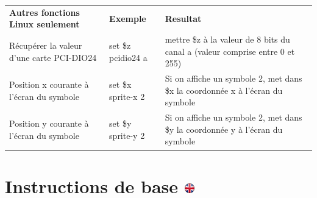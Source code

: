 \documentclass[
]{book}
\begin{document}
\begin{longtable}[]{@{}lll@{}}
\toprule
\endhead
\begin{minipage}[t]{0.29\columnwidth}\raggedright
\textbf{Autres fonctions Linux seulement}\strut
\end{minipage} & \begin{minipage}[t]{0.15\columnwidth}\raggedright
\textbf{Exemple}\strut
\end{minipage} & \begin{minipage}[t]{0.47\columnwidth}\raggedright
\textbf{Resultat}\strut
\end{minipage}\tabularnewline
\begin{minipage}[t]{0.29\columnwidth}\raggedright
Récupérer la valeur d'une carte PCI-DIO24\strut
\end{minipage} & \begin{minipage}[t]{0.15\columnwidth}\raggedright
set \$z pcidio24 a\strut
\end{minipage} & \begin{minipage}[t]{0.47\columnwidth}\raggedright
mettre \$z à la valeur de 8 bits du canal a (valeur comprise entre 0 et 255)\strut
\end{minipage}\tabularnewline
\begin{minipage}[t]{0.29\columnwidth}\raggedright
Position x courante à l'écran du symbole\strut
\end{minipage} & \begin{minipage}[t]{0.15\columnwidth}\raggedright
set \$x sprite-x 2\strut
\end{minipage} & \begin{minipage}[t]{0.47\columnwidth}\raggedright
Si on affiche un symbole 2, met dans \$x la coordonnée x à l'écran du symbole\strut
\end{minipage}\tabularnewline
\begin{minipage}[t]{0.29\columnwidth}\raggedright
Position y courante à l'écran du symbole\strut
\end{minipage} & \begin{minipage}[t]{0.15\columnwidth}\raggedright
set \$y sprite-y 2\strut
\end{minipage} & \begin{minipage}[t]{0.47\columnwidth}\raggedright
Si on affiche un symbole 2, met dans \$y la coordonnée y à l'écran du symbole\strut
\end{minipage}\tabularnewline
\bottomrule
\end{longtable}

\hypertarget{instructions-de-base}{%
\section[Instructions de base ]{\texorpdfstring{Instructions de base \href{https://www.psytoolkit.org/doc3.2.0/syntax.html\#_commonly_used_instructions}{\protect\includegraphics{img/ukflag.png}}}{Instructions de base }}\label{instructions-de-base}}
\end{document}
